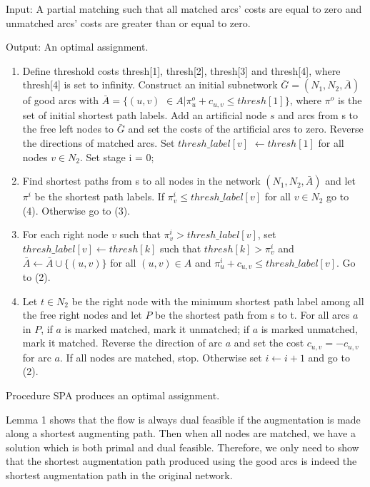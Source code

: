 {\it 

Input: A partial matching such that all matched arcs' costs are equal
to zero and unmatched arcs' costs are greater than or equal to zero.

Output: An optimal assignment.

\begin{enumerate}

\item Define threshold costs thresh[1], thresh[2], thresh[3] and
thresh[4], where thresh[4] is set to infinity. Construct an initial
subnetwork $\bar G =(N_1,N_2,\bar A)$ of good arcs with $\bar A =\{
(u,v)$ $\in A|\pi^o_u + c_{u,v} \leq thresh[1]\}$, where $\pi^o$ is
the set of initial shortest path labels.  Add an artificial node $s$
and arcs from s to the free left nodes to $\bar G$ and set the costs
of the artificial arcs to zero.  Reverse the directions of matched
arcs.  Set $thresh\_label[v]$ $\leftarrow thresh[1]$ for all nodes
$v\in N_2$.  Set stage i = 0;

\item Find shortest paths from s to all nodes in the network
$(N_1,N_2,\bar A)$ and let $\pi^i$ be the shortest path labels. If
$\pi^i_v \leq thresh\_label[v]$ for all $v\in N_2$ go to (4).
Otherwise go to (3).

\item For each right node $v$ such that $\pi^i_v > thresh\_label[v]$,
set $thresh\_label[v]\leftarrow thresh[k]$ such that $thresh[k] >
\pi^i_v$ and $\bar A \leftarrow \bar A \cup \{(u,v)\}$ for all
$(u,v)\in A$ and $\pi^i_u + c_{u,v} \leq thresh\_label[v]$. Go to (2).

\item Let $t\in N_2$ be the right node with the minimum shortest path
label among all the free right nodes and let $P$ be the shortest path
from s to t.  For all arcs $a$ in $P$, if $a$ is marked matched, mark
it unmatched; if $a$ is marked unmatched, mark it matched. Reverse the
direction of arc $a$ and set the cost $c_{u,v} = - c_{u,v}$ for arc
$a$. If all nodes are matched, stop. Otherwise set $i \leftarrow i + 1$ and
go to (2).

\end{enumerate}
}

\vskip 2pt
 Procedure SPA produces an optimal
assignment.

\proof Lemma 1 shows that the flow is always dual feasible if the
augmentation is made along a shortest augmenting path. Then when all
nodes are matched, we have a solution which is both primal and dual
feasible.  Therefore, we only need to show that the shortest
augmentation path produced using the good arcs is indeed the shortest
augmentation path in the original network.

